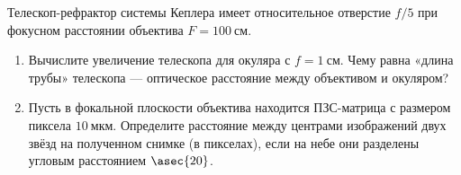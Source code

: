 Телескоп-рефрактор системы Кеплера имеет относительное отверстие $f/5$
при фокусном расстоянии объектива $F = \qty{100}{см}$.
\begin{enumerate}
  \item Вычислите увеличение телескопа для окуляра с $f = \qty{1}{см}$.
        Чему равна «длина трубы» телескопа — оптическое расстояние между
        объективом и окуляром?
  \item Пусть в фокальной плоскости объектива находится ПЗС-матрица
        с размером пиксела $\qty{10}{мкм}$. Определите расстояние между
        центрами изображений двух звёзд на полученном снимке (в пикселах),
        если на небе они разделены угловым расстоянием $\asec{20}$.
\end{enumerate}
